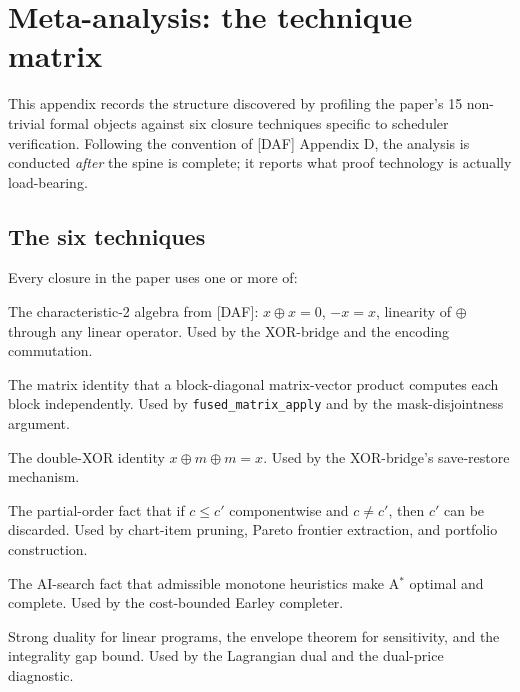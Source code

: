 \section{Meta-analysis: the technique matrix}\label{app:meta}

This appendix records the structure discovered by
profiling the paper's 15 non-trivial formal objects
against six closure techniques specific to
scheduler verification. Following the convention
of [DAF] Appendix D, the analysis is conducted
\emph{after} the spine is complete; it reports
what proof technology is actually load-bearing.

\subsection{The six techniques}

Every closure in the paper uses one or more of:

\begin{description}[nosep,leftmargin=1.5cm]
  \item[S1: $\GF(2)$ linearity] The
    characteristic-2 algebra from [DAF]: $x \oplus
    x = 0$, $-x = x$, linearity of $\oplus$ through
    any linear operator. Used by the XOR-bridge and
    the encoding commutation.
  \item[S2: Block-diagonal decomposition] The matrix
    identity that a block-diagonal matrix-vector
    product computes each block independently. Used
    by \texttt{fused\_matrix\_apply} and by the
    mask-disjointness argument.
  \item[S3: XOR reversibility] The double-XOR
    identity $x \oplus m \oplus m = x$. Used by the
    XOR-bridge's save-restore mechanism.
  \item[S4: Pareto dominance] The partial-order
    fact that if $c \leq c'$ componentwise and
    $c \neq c'$, then $c'$ can be discarded. Used
    by chart-item pruning, Pareto frontier
    extraction, and portfolio construction.
  \item[S5: A$^*$ admissibility] The AI-search fact
    that admissible monotone heuristics make A$^*$
    optimal and complete. Used by the cost-bounded
    Earley completer.
  \item[S6: LP relaxation \& duality] Strong duality
    for linear programs, the envelope theorem for
    sensitivity, and the integrality gap bound.
    Used by the Lagrangian dual and the dual-price
    diagnostic.
\end{description}

